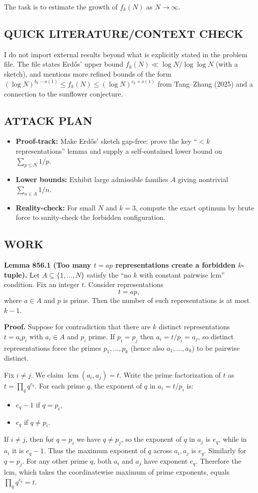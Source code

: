 The task is to estimate the growth of $f_k(N)$ as $N\to\infty$.

\subsection*{QUICK LITERATURE/CONTEXT CHECK}
I do not import external results beyond what is explicitly stated in the problem file. The file states Erd\H{o}s' upper bound $f_k(N)\ll \log N/\log\log N$ (with a sketch), and mentions more refined bounds of the form $(\log N)^{b_k-o(1)}\le f_k(N)\le (\log N)^{c_k+o(1)}$ from Tang--Zhang (2025) and a connection to the sunflower conjecture.

\subsection*{ATTACK PLAN}
\begin{itemize}
\item \textbf{Proof-track:} Make Erd\H{o}s' sketch gap-free: prove the key ``$<k$ representations'' lemma and supply a self-contained lower bound on $\sum_{p\le N} 1/p$.
\item \textbf{Lower bounds:} Exhibit large admissible families $A$ giving nontrivial $\sum_{n\in A} 1/n$.
\item \textbf{Reality-check:} For small $N$ and $k=3$, compute the exact optimum by brute force to sanity-check the forbidden configuration.
\end{itemize}

\subsection*{WORK}
\textbf{Lemma 856.1 (Too many $t=ap$ representations create a forbidden $k$-tuple).}
Let $A\subseteq\{1,\dots,N\}$ satisfy the ``no $k$ with constant pairwise lcm'' condition. Fix an integer $t$.
Consider representations
\[
  t = a p,
\]
where $a\in A$ and $p$ is prime.
Then the number of such representations is at most $k-1$.

\textbf{Proof.}
Suppose for contradiction that there are $k$ distinct representations $t=a_i p_i$ with $a_i\in A$ and $p_i$ prime.
If $p_i=p_j$ then $a_i=t/p_i=a_j$, so distinct representations force the primes $p_1,\dots,p_k$ (hence also $a_1,\dots,a_k$) to be pairwise distinct.

Fix $i\ne j$. We claim $\operatorname{lcm}(a_i,a_j)=t$.
Write the prime factorization of $t$ as $t=\prod_q q^{e_q}$.
For each prime $q$, the exponent of $q$ in $a_i=t/p_i$ is:
\begin{itemize}
\item $e_q-1$ if $q=p_i$,
\item $e_q$ if $q\ne p_i$.
\end{itemize}
If $i\ne j$, then for $q=p_i$ we have $q\ne p_j$, so the exponent of $q$ in $a_j$ is $e_q$, while in $a_i$ it is $e_q-1$. Thus the maximum exponent of $q$ across $a_i,a_j$ is $e_q$.
Similarly for $q=p_j$. For any other prime $q$, both $a_i$ and $a_j$ have exponent $e_q$.
Therefore the lcm, which takes the coordinatewise maximum of prime exponents, equals $\prod_q q^{e_q}=t$.

